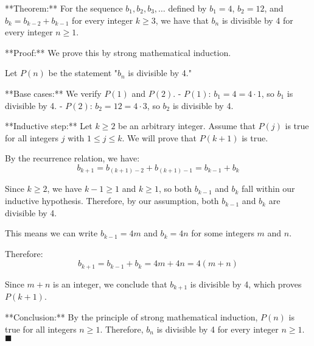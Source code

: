\documentclass[11pt]{article}
\begin{document}
	
	
**Theorem:** For the sequence $b_1, b_2, b_3, \ldots$ defined by $b_1 = 4$, $b_2 = 12$, and $b_k = b_{k-2} + b_{k-1}$ for every integer $k \geq 3$, we have that $b_n$ is divisible by 4 for every integer $n \geq 1$.

**Proof:** We prove this by strong mathematical induction.

Let $P(n)$ be the statement "$b_n$ is divisible by 4."

**Base cases:** We verify $P(1)$ and $P(2)$.
- $P(1)$: $b_1 = 4 = 4 \cdot 1$, so $b_1$ is divisible by 4.
- $P(2)$: $b_2 = 12 = 4 \cdot 3$, so $b_2$ is divisible by 4.

**Inductive step:** Let $k \geq 2$ be an arbitrary integer. Assume that $P(j)$ is true for all integers $j$ with $1 \leq j \leq k$. We will prove that $P(k+1)$ is true.

By the recurrence relation, we have:
$$b_{k+1} = b_{(k+1)-2} + b_{(k+1)-1} = b_{k-1} + b_k$$

Since $k \geq 2$, we have $k-1 \geq 1$ and $k \geq 1$, so both $b_{k-1}$ and $b_k$ fall within our inductive hypothesis. Therefore, by our assumption, both $b_{k-1}$ and $b_k$ are divisible by 4.

This means we can write $b_{k-1} = 4m$ and $b_k = 4n$ for some integers $m$ and $n$.

Therefore:
$$b_{k+1} = b_{k-1} + b_k = 4m + 4n = 4(m + n)$$

Since $m + n$ is an integer, we conclude that $b_{k+1}$ is divisible by 4, which proves $P(k+1)$.

**Conclusion:** By the principle of strong mathematical induction, $P(n)$ is true for all integers $n \geq 1$. Therefore, $b_n$ is divisible by 4 for every integer $n \geq 1$. $\blacksquare$
	
\end{document}
